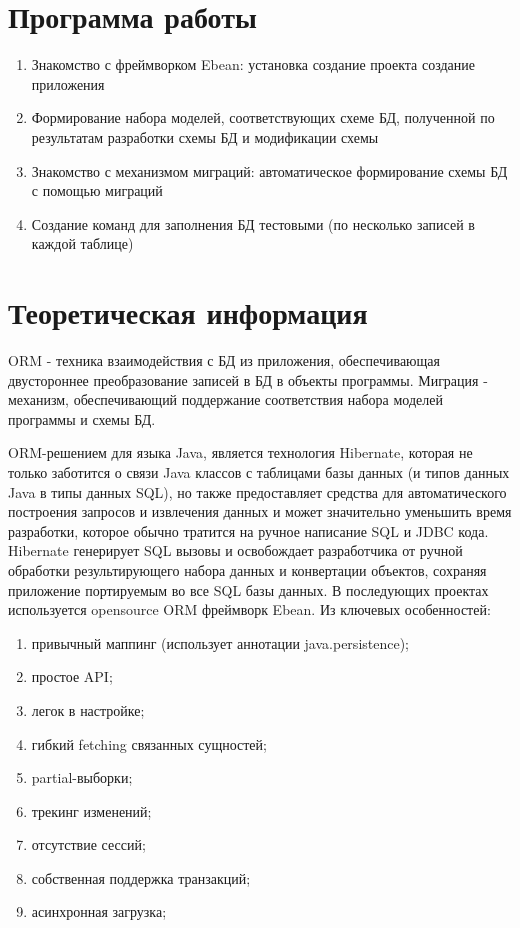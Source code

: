 \documentclass[a4paper]{article}
\begin{document}
\section{Программа работы}
\begin{enumerate}
	\item Знакомство с фреймворком Ebean:
	\subitem установка
	\subitem создание проекта
	\subitem создание приложения
	\item Формирование набора моделей, соответствующих схеме БД, полученной по результатам разработки схемы БД и модификации схемы
	\item Знакомство с механизмом миграций: автоматическое формирование схемы БД с помощью миграций
	\item Создание команд для заполнения БД тестовыми (по несколько записей в каждой таблице)
\end{enumerate}

\section{Теоретическая информация}
ORM - техника взаимодействия с БД из приложения, обеспечивающая двустороннее преобразование записей в БД в объекты программы.
Миграция - механизм, обеспечивающий поддержание соответствия набора моделей программы и схемы БД.

ORM-решением для языка Java, является технология Hibernate, которая не только заботится о связи Java классов с таблицами базы данных (и типов данных Java в типы данных SQL), но также предоставляет средства для автоматического построения запросов и извлечения данных и может значительно уменьшить время разработки, которое обычно тратится на ручное написание SQL и JDBC кода. Hibernate генерирует SQL вызовы и освобождает разработчика от ручной обработки результирующего набора данных и конвертации объектов, сохраняя приложение портируемым во все SQL базы данных.
В последующих проектах используется opensource ORM фреймворк Ebean. Из ключевых особенностей:
\begin{enumerate}
	\item привычный маппинг (использует аннотации java.persistence);
	\item простое API;
	\item легок в настройке;
	\item гибкий fetching связанных сущностей;
	\item partial-выборки;
	\item трекинг изменений;
	\item отсутствие сессий;
	\item собственная поддержка транзакций;
	\item асинхронная загрузка;
\end{enumerate}
\end{document}
